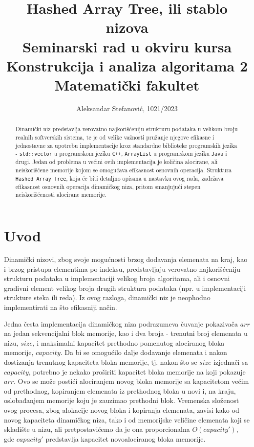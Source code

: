 \documentclass[a4paper]{article}
\title{Hashed Array Tree, ili stablo nizova\\ \small{Seminarski rad u okviru kursa\\Konstrukcija i analiza algoritama 2\\ Matematički fakultet}}
\author{Aleksandar Stefanović, 1021/2023}
\begin{document}
\maketitle

\begin{abstract}
Dinamički niz predstavlja verovatno najkorišćeniju strukturu podataka u velikom broju realnih softverskih sistema, te je od velike važnosti pružanje njegove efikasne i jednostavne za upotrebu implementacije kroz standardne biblioteke programskih jezika - \verb|std::vector| u programskom jeziku \verb|C++|, \verb|ArrayList| u programskom jeziku \verb|Java| i drugi. Jedan od problema u većini ovih implementacija je količina alocirane, ali neiskorišćene memorije kojom se omogućava efikasnost osnovnih operacija. Struktura \verb|Hashed Array Tree|, koja će biti detaljno opisana u nastavku ovog rada, zadržava efikasnost osnovnih operacija dinamičkog niza, pritom smanjujući stepen neiskorišćenosti alocirane memorije.
\end{abstract}

\tableofcontents

\newpage

\section{Uvod}

Dinamički nizovi, zbog svoje mogućnosti brzog dodavanja elemenata na kraj, kao i brzog pristupa elementima po indeksu, predstavljaju verovatno najkorišćeniju strukturu podataka u implementaciji velikog broja algoritama, ali i osnovni gradivni element velikog broja drugih struktura podataka (npr. u implementaciji strukture steka ili reda). Iz ovog razloga, dinamički niz je neophodno implementirati na što efikasniji način.

Jedna česta implementacija dinamičkog niza podrazumeva čuvanje pokazivača $arr$ na jedan sekvencijalni blok memorije, kao i dva broja - trenutni broj elemenata u nizu, $size$, i maksimalni kapacitet prethodno pomenutog alociranog bloka memorije, $capacity$. Da bi se omogućilo dalje dodavanje elemenata i nakon dostizanja trenutnog kapaciteta bloka memorije, tj. nakon što se $size$ izjednači sa $capacity$, potrebno je nekako proširiti kapacitet bloka memorije na koji pokazuje $arr$. Ovo se može postići alociranjem novog bloka memorije sa kapacitetom većim od prethodnog, kopiranjem elemenata iz prethodnog bloka u novi i, na kraju, oslobađanjem memorije koju je zauzimao prethodni blok. Vremenska složenost ovog procesa, zbog alokacije novog bloka i kopiranja elemenata, zavisi kako od novog kapaciteta dinamičkog niza, tako i od memorijske veličine elemenata koji se skladište u nizu, ali pretpostavićemo da je ona proporcionalna $O(capacity')$, gde $capacity'$ predstavlja kapacitet novoalociranog bloka memorije.
\end{document}
